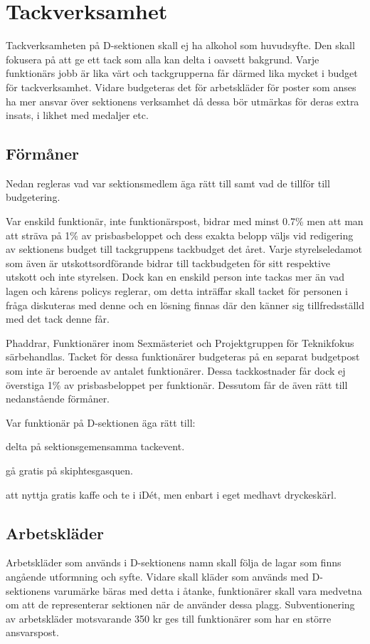 \documentclass{dsekprotokoll}
\begin{document}
\section{Tackverksamhet}
Tackverksamheten på D-sektionen skall ej ha alkohol som huvudsyfte. Den skall fokusera på att ge ett tack som alla kan delta i oavsett bakgrund. Varje funktionärs jobb är lika värt och tackgrupperna får därmed lika mycket i budget för tackverksamhet. Vidare budgeteras det för arbetskläder för poster som anses ha mer ansvar över sektionens verksamhet då dessa bör utmärkas för deras extra insats, i likhet med medaljer etc.
\subsection{Förmåner}
\par Nedan regleras vad var sektionsmedlem äga rätt till samt vad de tillför till budgetering.
\par Var enskild funktionär, inte funktionärspost, bidrar med minst
0.7\% men att man att sträva på 1\% av prisbasbeloppet och dess exakta belopp väljs vid redigering av sektionens budget till tackgruppens tackbudget det året. Varje styrelseledamot som även är utskottsordförande bidrar till tackbudgeten för sitt respektive utskott och inte styrelsen. Dock kan en enskild person inte tackas mer än vad lagen och kårens policys reglerar, om detta inträffar skall tacket för personen i fråga diskuteras med denne och en lösning finnas där den känner sig tillfredsställd med det tack denne får.
\par Phaddrar, Funktionärer inom Sexmästeriet och Projektgruppen för Teknikfokus särbehandlas. Tacket för dessa funktionärer budgeteras på en separat budgetpost som inte är beroende av antalet funktionärer. Dessa tackkostnader får dock ej överstiga 1\% av prisbasbeloppet per funktionär. Dessutom får de även rätt till nedanstående förmåner.

Var funktionär på D-sektionen äga rätt till:
\begin{attlista}
  \item delta på sektionsgemensamma tackevent.
  \item gå gratis på skiphtesgasquen.
  \item att nyttja gratis kaffe och te i iDét, men enbart i eget medhavt dryckeskärl.
\end{attlista}

\subsection{Arbetskläder}
\par Arbetskläder som används i D-sektionens namn skall följa de lagar som finns angående utformning och syfte. Vidare skall kläder som används med D-sektionens varumärke bäras med detta i åtanke, funktionärer skall vara medvetna om att de representerar sektionen när de använder dessa plagg.
Subventionering av arbetskläder motsvarande 350 kr ges till funktionärer som har en större ansvarspost.
\end{document}

